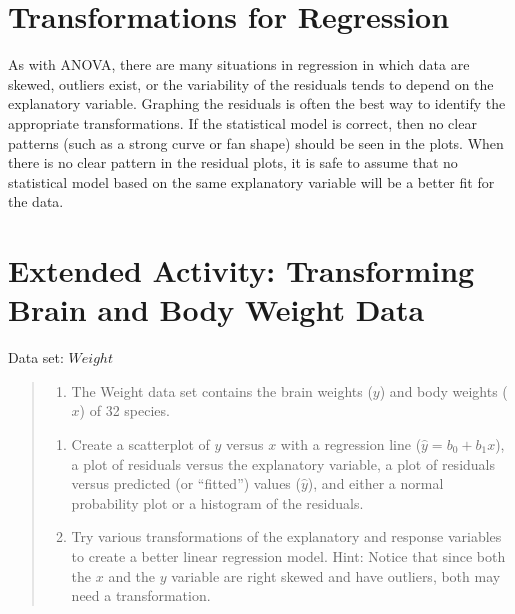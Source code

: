 \documentclass[
]{report}
\providecommand{\tightlist}{%
  \setlength{\itemsep}{0pt}\setlength{\parskip}{0pt}}
\begin{document}
\section*{Transformations for Regression}\label{transformations-for-regression}

As with ANOVA, there are many situations in regression in which data are skewed, outliers exist, or the variability of the residuals tends to depend on the explanatory variable. Graphing the residuals is often the best way to identify the appropriate transformations. If the statistical model is correct, then no clear patterns (such as a strong curve or fan shape) should be seen in the plots. When there is no clear pattern in the residual plots, it is safe to assume that no statistical model based on the same explanatory variable will be a better fit for the data.

\section*{Extended Activity: Transforming Brain and Body Weight Data}\label{extended-activity-transforming-brain-and-body-weight-data}

Data set: \(Weight\)

\begin{quote}
\begin{enumerate}
\def\labelenumi{\arabic{enumi}.}
\setcounter{enumi}{31}
\tightlist
\item
  The Weight data set contains the brain weights (\(y\)) and body weights (\(x\)) of 32 species.\\
\end{enumerate}

\begin{enumerate}
\def\labelenumi{\alph{enumi}.}
\tightlist
\item
  Create a scatterplot of \(y\) versus \(x\) with a regression line (\(\hat{y} = b_0 + b_1x\)), a plot of residuals versus the explanatory variable, a plot of residuals versus predicted (or ``fitted'') values (\(\hat{y}\)), and either a normal probability plot or a histogram of the residuals.\\
\item
  Try various transformations of the explanatory and response variables to create a better linear regression model. Hint: Notice that since both the \(x\) and the \(y\) variable are right skewed and have outliers, both may need a transformation.
\end{enumerate}
\end{quote}
\end{document}
